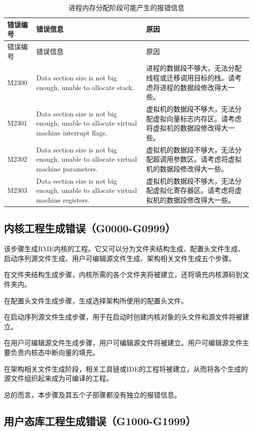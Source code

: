 \begin{xltabular}{\textwidth}{@{}>{\hsize\raggedright\arraybackslash}X>{\hsize\raggedright\arraybackslash}X>{\hsize\raggedright\arraybackslash}X@{}}
\caption{进程内存分配阶段可能产生的报错信息}\label{tab:5-26}\\
\toprule
错误编号 & 错误信息 & 原因\tabularnewline
\endfirsthead
\toprule
错误编号 & 错误信息 & 原因\tabularnewline
\midrule
\endhead
\bottomrule
\endlastfoot
M2300 & Data section size is not big enough, unable to allocate stack. &
进程的数据段不够大，无法分配线程或迁移调用目标的栈。请考虑将进程的数据段修改得大一些。\tabularnewline
M2301 & Data section size is not big enough, unable to allocate virtual
machine interrupt flags. &
虚拟机的数据段不够大，无法分配虚拟向量标志内存区。请考虑将虚拟机的数据段修改得大一些。\tabularnewline
M2302 & Data section size is not big enough, unable to allocate virtual
machine parameters. &
虚拟机的数据段不够大，无法分配超调用参数区。请考虑将虚拟机的数据段修改得大一些。\tabularnewline
M2303 & Data section size is not big enough, unable to allocate virtual
machine registers. &
虚拟机的数据段不够大，无法分配虚拟化寄存器区。请考虑将虚拟机的数据段修改得大一些。\tabularnewline
\end{xltabular}

\subsection{内核工程生成错误（G0000-G0999）}\label{subsec:5-6-7}

该步骤生成RME内核的工程。它又可以分为文件夹结构生成、配置头文件生成、启动序列源文件生成、用户可编辑源文件生成、架构相关文件生成五个步骤。

在文件夹结构生成步骤，内核所需的各个文件夹将被建立，还将填充内核源码到文件夹内。

在配置头文件生成步骤，生成选择架构所使用的配置头文件。

在启动序列源文件生成步骤，用于在启动时创建内核对象的头文件和源文件将被建立。

在用户可编辑源文件生成步骤，用户可编辑源文件将被建立。用户可编辑源文件主要负责内核态中断向量的填充。

在架构相关文件生成阶段，相关工具链或IDE的工程将被建立，从而将各个生成的源文件组织起来成为可编译的工程。

总的而言，本步骤及其五个子部骤都没有独立的报错信息。

\subsection{用户态库工程生成错误（G1000-G1999）}\label{subsec:5-6-8}

